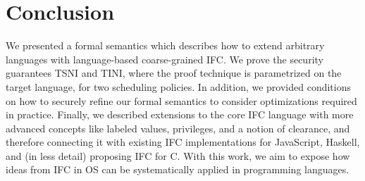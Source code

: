 \section{Conclusion}
\label{sec:conclusion}

We presented a formal semantics which describes how to extend arbitrary languages
with language-based coarse-grained IFC. We prove the security guarantees
TSNI and TINI, where the proof technique is parametrized on the
target language, for two scheduling policies. In
addition, we provided conditions on how to securely refine our formal semantics to
consider optimizations required in practice. Finally, we described extensions to
the core IFC language with more advanced concepts like labeled values, privileges,
and a notion of clearance, and therefore connecting it with existing
IFC implementations for JavaScript, Haskell, and (in
less detail) proposing IFC for C. With this work, we aim to expose how ideas
from IFC in OS can be systematically applied in programming languages.


